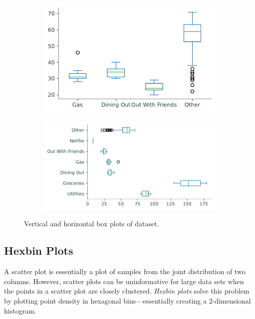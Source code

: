 \begin{figure}[H] %
\captionsetup[subfigure]{justification=centering}
\centering
\begin{subfigure}{.49\textwidth}
    \includegraphics[width=\textwidth]{figures/box1.pdf}
\end{subfigure}
%
\begin{subfigure}{.49\textwidth}
    \includegraphics[width=\textwidth]{figures/box2.pdf}
\end{subfigure}
\caption{Vertical and horizontal box plots of  dataset.}
\end{figure}


\subsection*{Hexbin Plots} %

A scatter plot is essentially a plot of samples from the joint distribution of two columns.
However, scatter plots can be uninformative for large data sets when the points in a scatter plot are closely clustered.
\emph{Hexbin plots} solve this problem by plotting point density in hexagonal bins---essentially creating a 2-dimensional histogram.

